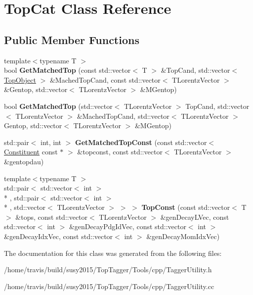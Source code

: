 \hypertarget{classTopCat}{\section{Top\-Cat Class Reference}
\label{classTopCat}
}
\subsection*{Public Member Functions}
\begin{DoxyCompactItemize}
\item 
\hypertarget{classTopCat_a61e662422b74d9052978531013a119e8}{{\footnotesize template$<$typename T $>$ }\\bool {\bfseries Get\-Matched\-Top} (const std\-::vector$<$ T $>$ \&Top\-Cand, std\-::vector$<$ \hyperlink{classTopObject}{Top\-Object} $>$ \&Mached\-Top\-Cand, const std\-::vector$<$ T\-Lorentz\-Vector $>$ \&Gentop, std\-::vector$<$ T\-Lorentz\-Vector $>$ \&M\-Gentop)}\label{classTopCat_a61e662422b74d9052978531013a119e8}

\item 
\hypertarget{classTopCat_a179ae0049fa26f8bf1e651890cc996ac}{bool {\bfseries Get\-Matched\-Top} (std\-::vector$<$ T\-Lorentz\-Vector $>$ Top\-Cand, std\-::vector$<$ T\-Lorentz\-Vector $>$ \&Mached\-Top\-Cand, std\-::vector$<$ T\-Lorentz\-Vector $>$Gentop, std\-::vector$<$ T\-Lorentz\-Vector $>$ \&M\-Gentop)}\label{classTopCat_a179ae0049fa26f8bf1e651890cc996ac}

\item 
\hypertarget{classTopCat_a9b53819ee2fa66f3e6dd51e500c45670}{std\-::pair$<$ int, int $>$ {\bfseries Get\-Matched\-Top\-Const} (const std\-::vector$<$ \hyperlink{classConstituent}{Constituent} const $\ast$ $>$ \&topconst, const std\-::vector$<$ T\-Lorentz\-Vector $>$ \&gentopdau)}\label{classTopCat_a9b53819ee2fa66f3e6dd51e500c45670}

\item 
\hypertarget{classTopCat_acb1ae1bcd54353db3784447317f69dd5}{{\footnotesize template$<$typename T $>$ }\\std\-::pair$<$ std\-::vector$<$ int $>$\\*
, std\-::pair$<$ std\-::vector$<$ int $>$\\*
, std\-::vector$<$ T\-Lorentz\-Vector $>$ $>$ $>$ {\bfseries Top\-Const} (const std\-::vector$<$ T $>$ \&tops, const std\-::vector$<$ T\-Lorentz\-Vector $>$ \&gen\-Decay\-L\-Vec, const std\-::vector$<$ int $>$ \&gen\-Decay\-Pdg\-Id\-Vec, const std\-::vector$<$ int $>$ \&gen\-Decay\-Idx\-Vec, const std\-::vector$<$ int $>$ \&gen\-Decay\-Mom\-Idx\-Vec)}\label{classTopCat_acb1ae1bcd54353db3784447317f69dd5}

\end{DoxyCompactItemize}


The documentation for this class was generated from the following files\-:\begin{DoxyCompactItemize}
\item 
/home/travis/build/susy2015/\-Top\-Tagger/\-Tools/cpp/Tagger\-Utility.\-h\item 
/home/travis/build/susy2015/\-Top\-Tagger/\-Tools/cpp/Tagger\-Utility.\-cc\end{DoxyCompactItemize}
